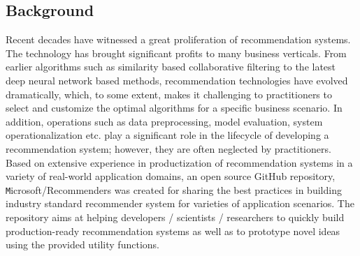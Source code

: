 \documentclass[twoside,11pt]{article}
\begin{document}
\subsection{Background}
Recent decades have witnessed a great proliferation of recommendation systems. The technology has brought significant profits to many business verticals. From earlier algorithms such as similarity based collaborative filtering to the latest deep neural network based methods, recommendation technologies have evolved dramatically, which, to some extent, makes it challenging to practitioners to select and customize the optimal algorithms for a specific business scenario. In addition, operations such as data preprocessing, model evaluation, system operationalization etc. play a significant role in the lifecycle of developing a recommendation system; however, they are often neglected by practitioners. 
Based on extensive experience in productization of recommendation systems in a variety of real-world application domains, an open source GitHub repository, \texttt Microsoft/Recommenders was created for sharing the best practices in building industry standard recommender system for varieties of application scenarios. The repository aims at helping developers / scientists / researchers to quickly build production-ready recommendation systems as well as to prototype novel ideas using the provided utility functions. 
\end{document}
